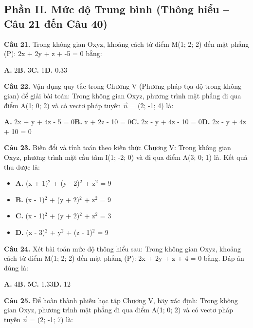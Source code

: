 \documentclass[11pt,a4paper]{article}
\begin{document}
\subsection*{\color{accent} Phần II. Mức độ Trung bình (Thông hiểu -- Câu 21 đến Câu 40)}
\textbf{\color{primary} Câu 21.} Trong không gian Oxyz, khoảng cách từ điểm M(1; 2; 2) đến mặt phẳng (P): 2x + 2y + z + -5 = 0 bằng:\par
\hspace*{1.5em}\textbf{A.} 2\quad\quad \textbf{B.} 3\quad\quad \textbf{C.} 1\quad\quad \textbf{D.} 0.33\par\vspace{2pt}
\textbf{\color{primary} Câu 22.} Vận dụng quy tắc trong Chương V (Phương pháp tọa độ trong không gian) để giải bài toán: Trong không gian Oxyz, phương trình mặt phẳng đi qua điểm A(1; 0; 2) và có vectơ pháp tuyến $\vec{n}$ = (2; -1; 4) là:\par
\hspace*{1.5em}\textbf{A.} 2x + y + 4z - 5 = 0\quad\quad \textbf{B.} x + 2z - 10 = 0\quad\quad \textbf{C.} 2x - y + 4z - 10 = 0\quad\quad \textbf{D.} 2x - y + 4z + 10 = 0\par\vspace{2pt}
\textbf{\color{primary} Câu 23.} Biến đổi và tính toán theo kiến thức Chương V: Trong không gian Oxyz, phương trình mặt cầu tâm I(1; -2; 0) và đi qua điểm A(3; 0; 1) là. Kết quả thu được là:\par
\begin{itemize}\setlength{\itemsep}{1pt}\setlength{\parskip}{0pt}
  \item[] \textbf{A.} (x + 1)$^2$ + (y - 2)$^2$ + z$^2$ = 9
  \item[] \textbf{B.} (x - 1)$^2$ + (y + 2)$^2$ + z$^2$ = 9
  \item[] \textbf{C.} (x - 1)$^2$ + (y + 2)$^2$ + z$^2$ = 3
  \item[] \textbf{D.} (x - 3)$^2$ + y$^2$ + (z - 1)$^2$ = 9
\end{itemize}\vspace{2pt}
\textbf{\color{primary} Câu 24.} Xét bài toán mức độ thông hiểu sau: Trong không gian Oxyz, khoảng cách từ điểm M(1; 2; 2) đến mặt phẳng (P): 2x + 2y + z + 4 = 0 bằng. Đáp án đúng là:\par
\hspace*{1.5em}\textbf{A.} 4\quad\quad \textbf{B.} 5\quad\quad \textbf{C.} 1.33\quad\quad \textbf{D.} 12\par\vspace{2pt}
\textbf{\color{primary} Câu 25.} Để hoàn thành phiếu học tập Chương V, hãy xác định: Trong không gian Oxyz, phương trình mặt phẳng đi qua điểm A(1; 0; 2) và có vectơ pháp tuyến $\vec{n}$ = (2; -1; 7) là:\par
\end{document}
